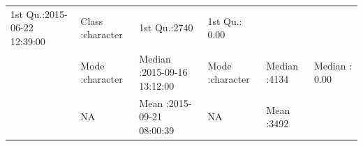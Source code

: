 \documentclass[]{article}
\begin{document}
\begin{longtable}[]{@{}llllll@{}}
\begin{minipage}[t]{0.24\columnwidth}
1st Qu.:2015-06-22 12:39:00\strut
\end{minipage} & \begin{minipage}[t]{0.15\columnwidth}\raggedright\strut
Class :character\strut
\end{minipage} & \begin{minipage}[t]{0.12\columnwidth}\raggedright\strut
1st Qu.:2740\strut
\end{minipage} & \begin{minipage}[t]{0.15\columnwidth}\raggedright\strut
1st Qu.: 0.00\strut
\end{minipage}\tabularnewline
\begin{minipage}[t]{0.03\columnwidth}\raggedright\strut
\strut
\end{minipage} & \begin{minipage}[t]{0.15\columnwidth}\raggedright\strut
Mode :character\strut
\end{minipage} & \begin{minipage}[t]{0.24\columnwidth}\raggedright\strut
Median :2015-09-16 13:12:00\strut
\end{minipage} & \begin{minipage}[t]{0.15\columnwidth}\raggedright\strut
Mode :character\strut
\end{minipage} & \begin{minipage}[t]{0.12\columnwidth}\raggedright\strut
Median :4134\strut
\end{minipage} & \begin{minipage}[t]{0.15\columnwidth}\raggedright\strut
Median : 0.00\strut
\end{minipage}\tabularnewline
\begin{minipage}[t]{0.03\columnwidth}\raggedright\strut
\strut
\end{minipage} & \begin{minipage}[t]{0.15\columnwidth}\raggedright\strut
NA\strut
\end{minipage} & \begin{minipage}[t]{0.24\columnwidth}\raggedright\strut
Mean :2015-09-21 08:00:39\strut
\end{minipage} & \begin{minipage}[t]{0.15\columnwidth}\raggedright\strut
NA\strut
\end{minipage} & \begin{minipage}[t]{0.12\columnwidth}\raggedright\strut
Mean :3492\strut
\end{minipage} & \begin{minipage}[t]{0.15\columnwidth}\raggedright\strut

\end{minipage}
\end{longtable}
\end{document}
